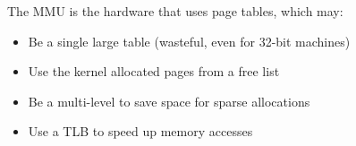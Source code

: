   \begin{slide}


    The MMU is the hardware that uses page tables, which may:

    \begin{itemize}
      \item Be a single large table (wasteful, even for 32-bit machines)
      \item Use the kernel allocated pages from a free list
      \item Be a multi-level to save space for sparse allocations
      \item Use a TLB to speed up memory accesses
    \end{itemize}

  \end{slide}


